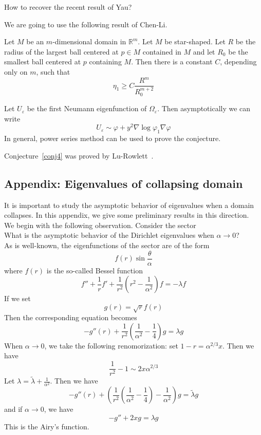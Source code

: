 \begin{question} How to recover the recent result of Yau?
\end{question}

We are going to use
the following result of Chen-Li.

\begin{theorem}
Let $M$ be an $m$-dimensional domain in $\mathbb{R}^m$. Let $M$ be star-shaped.
Let $R$ be the radius of the largest ball centered at $p\in M$ contained in $M$
and let $R_0$ be the smallest ball centered at $p$ containing $M$. Then there is
a constant $C$, depending only on $m$, such that
\[
\eta_1 \geqslant C\frac{R^m}{R_0^{m+2}}
\]
\end{theorem}

Let $U_\varepsilon$ be the first Neumann
eigenfunction of $\Omega_\varepsilon$. Then asymptotically we can write
\[
U_\varepsilon \sim \varphi + y^2 \nabla\log \varphi_1 \nabla\varphi
\]
In general, power series method can be used to prove the conjecture.

\begin{remark} Conjecture~\ref{conj4} was proved by Lu-Rowlett~\cite{lu-rowlett}.
\end{remark}

\subsection*{Appendix: Eigenvalues of collapsing domain}

It is important to study the asymptotic behavior of eigenvalues when a domain
collapses. In this appendix, we give some preliminary results in this direction.
\\

We begin with the following observation. Consider the sector
\\%
What is the asymptotic behavior of the Dirichlet eigenvalues when
$\alpha\rightarrow 0$?
\\

As is well-known, the eigenfunctions of the sector are of the form
\[
f(r)\sin\frac{\theta}{\alpha}
\]
where $f(r)$ is the so-called Bessel function
\[
f'' + \frac{1}{r}f' + \frac{1}{r^2}(r^2 - \frac{1}{\alpha^2})f = -\lambda f
\]
If we set
\[
g(r) = \sqrt{r} f(r)
\]
Then the corresponding equation becomes
\[
-g''(r) + \frac{1}{r^2}(\frac{1}{\alpha^2}-\frac{1}{4})g = \lambda g
\]
When $\alpha\rightarrow 0$, we take the following renomorization:
set $1 - r = \alpha^{2/3}x$. Then we have
\[
\frac{1}{r^2} - 1 \sim 2x\alpha^{2/3}
\]
Let $\lambda = \widetilde\lambda + \frac{1}{\alpha^2}$. Then we have
\[
-g''(r) + \left(\frac{1}{r^2}\left(\frac{1}{\alpha^2}-\frac{1}{4}\right)-
\frac{1}{\alpha^2}\right)g
= \widetilde\lambda g
\]
and if $\alpha\rightarrow 0$, we have
\[
-g'' + 2xg = \lambda g
\]
This is the Airy's function.
\\

